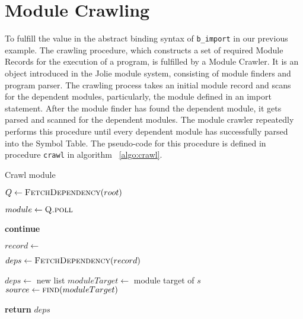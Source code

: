 \section{ Module Crawling }

To fulfill the value in the abstract binding syntax of \texttt{b_import} in our previous example. The crawling procedure, which constructs a set of required Module Records for the execution of a program, is fulfilled by a Module Crawler. It is an object introduced in the Jolie module system, consisting of module finders and program parser.
The crawling process takes an initial module record and scans for the dependent modules, particularly, the module defined in an import statement. After the module finder has found the dependent module, it gets parsed and scanned for the dependent modules. The module crawler repeatedly performs this procedure until every dependent module has successfully parsed into the Symbol Table. The pseudo-code for this procedure is defined in procedure \texttt{crawl} in algorithm ~\ref{algo:crawl}.

\begin{algorithm}[h]
    \caption{Crawl module}
    \label{algo:crawl}
    \begin{algorithmic}[1]



        \State $Q\gets \Call{FetchDependency}{root}$ 
        \State {} 

        \State $module\gets \Call{Q.poll}{}$

        \textbf{continue} 
        \EndIf

        \State $record\gets$  

        \State $deps\gets \Call{FetchDependency}{record}$
        \State {}
        \EndIf
        \EndFor
        \State {} 

        \EndWhile
        \EndProcedure



        \State $deps\gets$ new list
        \State $moduleTarget\gets$ module target of $s$
        \State $source\gets \Call{find}{moduleTarget}$ 

        \State {}
        \EndFor

        \State \textbf{return} $deps$ 
        \EndFunction

    \end{algorithmic}
\end{algorithm}
\FloatBarrier

